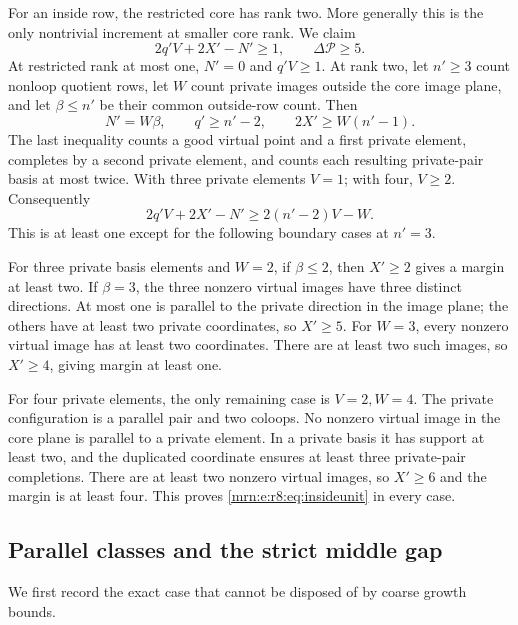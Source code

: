 \documentclass[11pt,a4paper]{article}
\theoremstyle{remark}\newtheorem{remark}[theorem]{Remark}
\begin{document}
For an inside row, the restricted core has rank two. More generally this is the only nontrivial increment at smaller core rank. We claim
\begin{equation}\label{mrn:e:r8:eq:insideunit}
 2q'V+2X'-N'\ge1,
 \qquad \Delta\mathcal P\ge5.
\end{equation}
At restricted rank at most one, $N'=0$ and $q'V\ge1$. At rank two, let $n'\ge3$ count nonloop quotient rows, let $W$ count private images outside the core image plane, and let $\beta\le n'$ be their common outside-row count. Then
\[
 N'=W\beta,\qquad q'\ge n'-2,\qquad 2X'\ge W(n'-1).
\]
The last inequality counts a good virtual point and a first private element, completes by a second private element, and counts each resulting private-pair basis at most twice. With three private elements $V=1$; with four, $V\ge2$. Consequently
\[
 2q'V+2X'-N'\ge2(n'-2)V-W.
\]
This is at least one except for the following boundary cases at $n'=3$.

For three private basis elements and $W=2$, if $\beta\le2$, then $X'\ge2$ gives a margin at least two. If $\beta=3$, the three nonzero virtual images have three distinct directions. At most one is parallel to the private direction in the image plane; the others have at least two private coordinates, so $X'\ge5$. For $W=3$, every nonzero virtual image has at least two coordinates. There are at least two such images, so $X'\ge4$, giving margin at least one.

For four private elements, the only remaining case is $V=2,W=4$. The private configuration is a parallel pair and two coloops. No nonzero virtual image in the core plane is parallel to a private element. In a private basis it has support at least two, and the duplicated coordinate ensures at least three private-pair completions. There are at least two nonzero virtual images, so $X'\ge6$ and the margin is at least four. This proves \eqref{mrn:e:r8:eq:insideunit} in every case.

\subsection{Parallel classes and the strict middle gap}
We first record the exact case that cannot be disposed of by coarse growth bounds.
\end{document}
